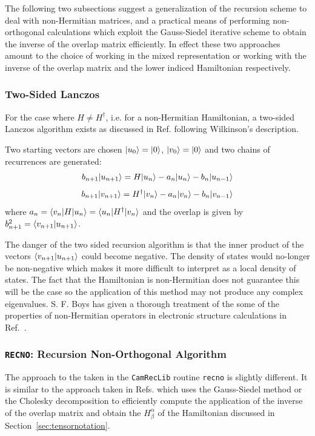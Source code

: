 The following two subsections suggest a generalization of the recursion
scheme to deal with non-Hermitian matrices, and a practical means
of performing non-orthogonal calculations which exploit the Gauss-Siedel
iterative scheme to obtain the inverse of the overlap matrix efficiently.
In effect these two approaches amount to the choice of working
in the mixed representation or working with the inverse of the overlap
matrix and the lower indiced Hamiltonian respectively.

\subsubsection{Two-Sided Lanczos}
For the case where $H\neq H^{\dagger}$, i.e. for a non-Hermitian
Hamiltonian, a two-sided Lanczos algorithm exists as discussed in
Ref.\cite{haydockkelly75} following Wilkinson's description.

Two starting vectors are chosen $|u_{0}\rangle=|0\rangle$, $|v_{0}\rangle=|0\rangle$
and two chains of recurrences are generated:
%
\begin{equation}
b_{n+1}|u_{n+1}\rangle = H|u_{n}\rangle - a_{n}|u_{n}\rangle - b_{n}|u_{n-1}\rangle
\end{equation}
%
\begin{equation}
b_{n+1}|v_{n+1}\rangle = H^{\dagger}|v_{n}\rangle - a_{n}|v_{n}\rangle - b_{n}|v_{n-1}\rangle
\end{equation}
%
where $a_{n} = \langle v_{n}|H|u_{n}\rangle = \langle u_{n}|H^{\dagger}|v_{n}\rangle$
and the overlap is given by $b^{2}_{n+1} = \langle v_{n+1}|u_{n+1}\rangle$.

The danger of the two sided recursion algorithm is that the inner
product of the vectors $\langle v_{n+1}|u_{n+1}\rangle$ could become negative.
The density of states would no-longer be non-negative which makes it
more difficult to interpret as a local density of states. The fact 
that the Hamiltonian is non-Hermitian does not guarantee this will 
be the case so the application of this method may not produce 
any complex eigenvalues. S. F. Boys has given a thorough treatment
of the some of the properties of non-Hermitian operators in electronic
structure calculations in Ref.~\cite{boys69}.

\subsubsection{\texttt{RECNO}: Recursion Non-Orthogonal Algorithm}
The approach to the  taken in the 
\texttt{CamRecLib} routine \texttt{recno} is slightly different.
It is similar to the approach taken in Refs.\cite{jones84, jones85} which
uses the Gauss-Siedel method or the Cholesky decomposition
to efficiently compute the application of the inverse of the overlap matrix
and obtain the $H^{\alpha}_{\beta}$ of the Hamiltonian discussed in 
Section~\ref{sec:tensornotation}.

